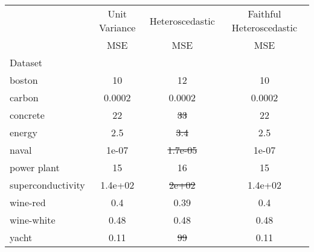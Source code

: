 \begin{tabular}{l|c|c|c}
\toprule
{} & {Unit Variance} & {Heteroscedastic} & {Faithful Heteroscedastic} \\
{} & {MSE} & {MSE} & {MSE} \\
{Dataset} & {} & {} & {} \\
\midrule
boston & 10 & 12 & 10 \\
carbon & 0.0002 & 0.0002 & 0.0002 \\
concrete & 22 & \sout{33} & 22 \\
energy & 2.5 & \sout{3.4} & 2.5 \\
naval & 1e-07 & \sout{1.7e-05} & 1e-07 \\
power plant & 15 & 16 & 15 \\
superconductivity & 1.4e+02 & \sout{2e+02} & 1.4e+02 \\
wine-red & 0.4 & 0.39 & 0.4 \\
wine-white & 0.48 & 0.48 & 0.48 \\
yacht & 0.11 & \sout{99} & 0.11 \\
\bottomrule
\end{tabular}
